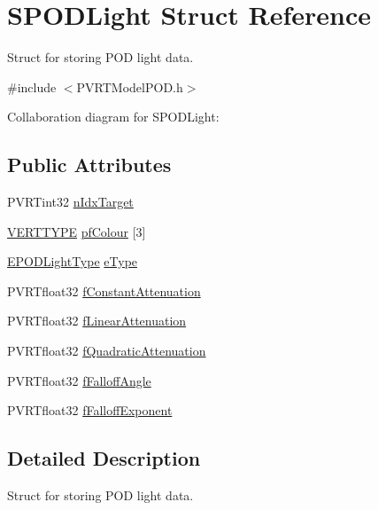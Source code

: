 \hypertarget{struct_s_p_o_d_light}{\section{S\+P\+O\+D\+Light Struct Reference}
\label{struct_s_p_o_d_light}
}


Struct for storing P\+O\+D light data.  




{\ttfamily \#include $<$P\+V\+R\+T\+Model\+P\+O\+D.\+h$>$}



Collaboration diagram for S\+P\+O\+D\+Light\+:
\subsection*{Public Attributes}
\begin{DoxyCompactItemize}
\item 
P\+V\+R\+Tint32 \hyperlink{struct_s_p_o_d_light_a658da875ecd7c7561dd4fa3842214409}{n\+Idx\+Target}
\item 
\hyperlink{group___a_p_i___o_g_l_e_s_ga06da457b7d3e93368ab904f89e1396be}{V\+E\+R\+T\+T\+Y\+P\+E} \hyperlink{struct_s_p_o_d_light_ab95d454ccc73d02d84f1aa69a4dd0d03}{pf\+Colour} \mbox{[}3\mbox{]}
\item 
\hyperlink{struct_e_p_o_d_light_type}{E\+P\+O\+D\+Light\+Type} \hyperlink{struct_s_p_o_d_light_ae3c2bbe7fb4f991d479a383c646629ba}{e\+Type}
\item 
P\+V\+R\+Tfloat32 \hyperlink{struct_s_p_o_d_light_a1aa0452799cfda2c3a358e48c3e9c822}{f\+Constant\+Attenuation}
\item 
P\+V\+R\+Tfloat32 \hyperlink{struct_s_p_o_d_light_a6bba814b949bb2070220df71824a59c1}{f\+Linear\+Attenuation}
\item 
P\+V\+R\+Tfloat32 \hyperlink{struct_s_p_o_d_light_a184cc38286b6eaf32bf571d818f86d80}{f\+Quadratic\+Attenuation}
\item 
P\+V\+R\+Tfloat32 \hyperlink{struct_s_p_o_d_light_ae86b850d6d902b0b40cff229a8a98e9b}{f\+Falloff\+Angle}
\item 
P\+V\+R\+Tfloat32 \hyperlink{struct_s_p_o_d_light_a6f57b5edb1af09a7e6381b1e7ebaffdc}{f\+Falloff\+Exponent}
\end{DoxyCompactItemize}


\subsection{Detailed Description}
Struct for storing P\+O\+D light data. 



